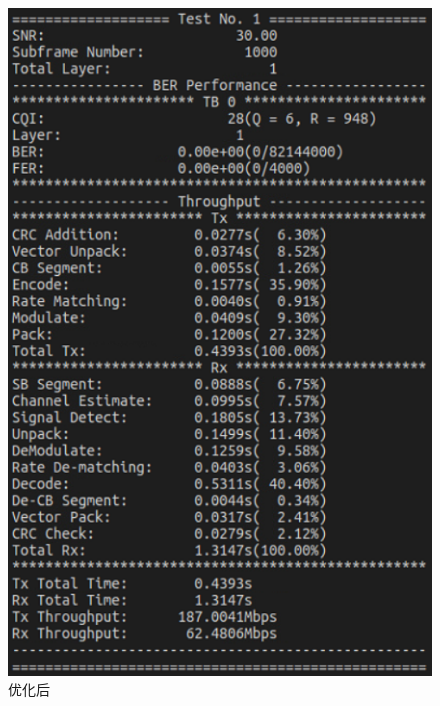 \documentclass{article}
\begin{document}
\begin{figure}[H]
\begin{minipage}[t]{0.48\textwidth}
		\includegraphics[width = \textwidth]{res1.png}
		\caption{优化后}
	\end{minipage}
\end{figure}
\end{document}
